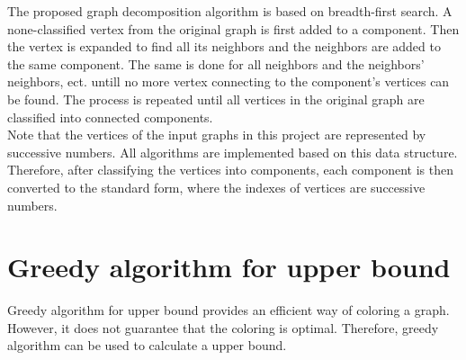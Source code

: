 \documentclass[a4paper]{report}
\begin{document}
%				
		The proposed graph decomposition algorithm is based on breadth-first search. A none-classified vertex from the original graph is first added to a component. Then the vertex is expanded to find all its neighbors and the neighbors are added to the same component. The same is done for all neighbors and the neighbors' neighbors, ect. untill no more vertex connecting to the component's vertices can be found. The process is repeated until all vertices in the original graph are classified into connected components.\\
		
		Note that the vertices of the input graphs in this project are represented by successive numbers. All algorithms are implemented based on this data structure. Therefore, after classifying the vertices into components, each component is then converted to the standard form, where the indexes of vertices are successive numbers.
		
		\section{Greedy algorithm for upper bound}
		Greedy algorithm for upper bound \cite{jensen2011graph} provides an efficient way of coloring a graph. However, it does not guarantee that the coloring is optimal. Therefore, greedy algorithm can be used to calculate a upper bound.\\
		
\end{document}
